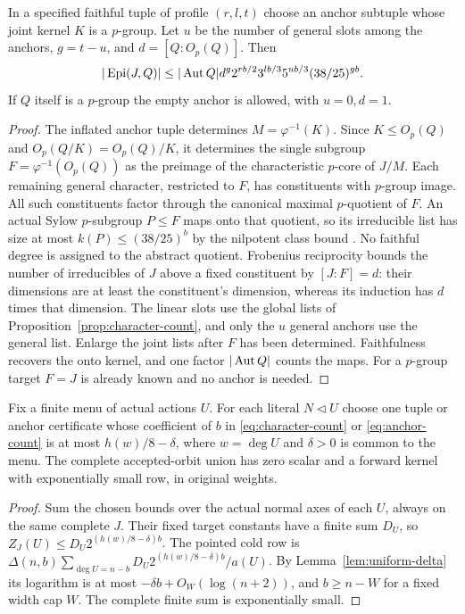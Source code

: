\begin{proposition}\label{prop:anchor-count}
In a specified faithful tuple of profile $(r,l,t)$ choose an anchor
subtuple whose joint kernel $K$ is a $p$-group. Let $u$ be the number
of general slots among the anchors, $g=t-u$, and $d=[Q:O_p(Q)]$.
Then
\begin{equation}\label{eq:anchor-count}
 |\operatorname{Epi}(J,Q)|\leq|\operatorname{Aut} Q|d^g
        2^{rb/2}3^{lb/3}5^{ub/3}(38/25)^{gb}.
\end{equation}
If $Q$ itself is a $p$-group the empty anchor is allowed, with
$u=0,d=1$.
\end{proposition}
\begin{proof}
The inflated anchor tuple determines $M=\varphi^{-1}(K)$.
Since $K\leq O_p(Q)$ and $O_p(Q/K)=O_p(Q)/K$, it determines the
single subgroup $F=\varphi^{-1}(O_p(Q))$ as the preimage of the
characteristic $p$-core of $J/M$.
Each remaining general character, restricted to $F$, has constituents
with $p$-group image. All such constituents factor through the canonical
maximal $p$-quotient of $F$. An actual Sylow $p$-subgroup $P\leq F$
maps onto that quotient, so its irreducible list has size at most
$k(P)\leq(38/25)^b$ by the nilpotent class bound
\cite[Theorem 1.5]{Maroti2005Classes}. No faithful degree is assigned
to the abstract quotient. Frobenius reciprocity bounds the number of
irreducibles of $J$ above a fixed constituent by $[J:F]=d$:
their dimensions are at least the constituent's dimension, whereas
its induction has $d$ times that dimension.
The linear slots use the global lists of Proposition~\ref{prop:character-count},
and only the $u$ general anchors use the general list. Enlarge the
joint lists after $F$ has been determined. Faithfulness recovers the
onto kernel, and one factor $|\operatorname{Aut} Q|$ counts the maps.
For a $p$-group target $F=J$ is already known and no anchor is needed.
\end{proof}

\begin{corollary}\label{cor:character-forward}
Fix a finite menu of actual actions $U$. For each literal $N\lhd U$
choose one tuple or anchor certificate whose coefficient of $b$ in
\eqref{eq:character-count} or \eqref{eq:anchor-count} is at most
$h(w)/8-\delta$, where $w=\deg U$ and $\delta>0$ is common to the
menu. The complete accepted-orbit union has zero scalar and a
forward kernel with exponentially small row, in original weights.
\end{corollary}
\begin{proof}
Sum the chosen bounds over the actual normal axes of each $U$,
always on the same complete $J$. Their fixed target constants have
a finite sum $D_U$, so $Z_J(U)\leq D_U2^{(h(w)/8-\delta)b}$.
The pointed cold row is
$\Delta(n,b)\sum_{\deg U=n-b}D_U2^{(h(w)/8-\delta)b}/a(U)$.
By Lemma~\ref{lem:uniform-delta} its logarithm is at most
$-\delta b+O_W(\log(n+2))$, and $b\geq n-W$ for a fixed width cap
$W$. The complete finite sum is exponentially small.
\end{proof}
